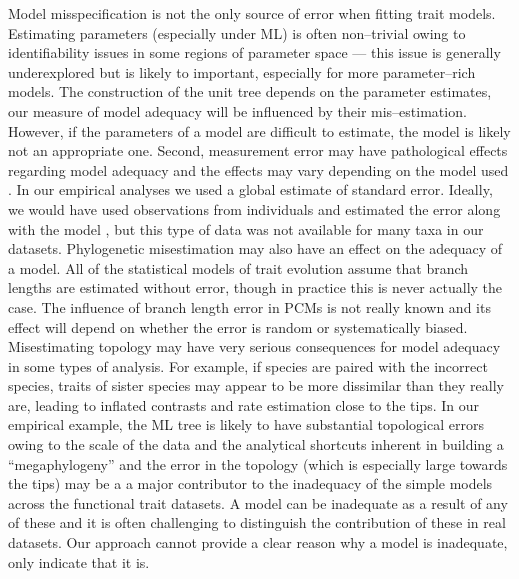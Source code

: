 \documentclass[a4paper,12pt]{article}
\begin{document}
Model misspecification is not the only source of error when fitting trait models. Estimating parameters (especially under ML) is often non--trivial owing to identifiability issues in some regions of parameter space \citep{Ane2008, HoAne2012} --- this issue is generally underexplored but is likely to important, especially for more parameter--rich models. The construction of the unit tree depends on the parameter estimates, our measure of model adequacy  will be influenced by their mis--estimation. However, if the parameters of a model are difficult to estimate, the model is likely not an appropriate one. Second, measurement error may have pathological effects regarding model adequacy and the effects may vary depending on the model used \citep{PennellPE}. In our empirical analyses we used a global estimate of standard error. Ideally, we would have used observations from individuals and estimated the error along with the model \citep{Ives2007, RevellReynolds2012, Hansen2012}, but this type of data was not available for many taxa in our datasets. Phylogenetic misestimation may also have an effect on the adequacy of a model. All of the statistical models of trait evolution assume that branch lengths are estimated without error, though in practice this is never actually the case. The influence of branch length error in PCMs is not really known and its effect will depend on whether the error is random or systematically biased. Misestimating topology may have very serious consequences for model adequacy in some types of analysis. For example, if species are paired with the incorrect species, traits of sister species may appear to be more dissimilar than they really are, leading to inflated contrasts and rate estimation close to the tips. In our empirical example, the ML tree is likely to have substantial topological errors owing to the scale of the data and the analytical shortcuts inherent in building a ``megaphylogeny'' \citep{Smith2009} and the error in the topology (which is especially large towards the tips) may be a a major contributor to the inadequacy of the simple models across the functional trait datasets. 
A model can be inadequate as a result of any of these and it is often challenging to distinguish the contribution of these in real datasets. Our approach cannot provide a clear reason why a model is inadequate, only indicate that it is.
\end{document}

